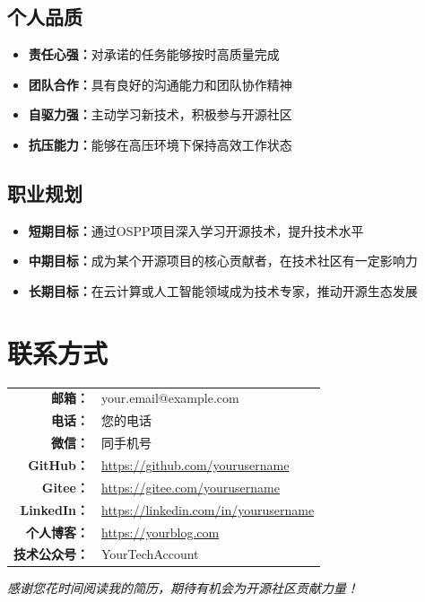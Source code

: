 \documentclass[a4paper,12pt]{article}
\makeatletter
\newcommand{\studentemail}{your.email@example.com}
\newcommand{\studentphone}{您的电话}
\makeatother
\begin{document}
\subsection{个人品质}
\begin{itemize}
    \item \textbf{责任心强：}对承诺的任务能够按时高质量完成
    \item \textbf{团队合作：}具有良好的沟通能力和团队协作精神
    \item \textbf{自驱力强：}主动学习新技术，积极参与开源社区
    \item \textbf{抗压能力：}能够在高压环境下保持高效工作状态
\end{itemize}

\subsection{职业规划}
\begin{itemize}
    \item \textbf{短期目标：}通过OSPP项目深入学习开源技术，提升技术水平
    \item \textbf{中期目标：}成为某个开源项目的核心贡献者，在技术社区有一定影响力
    \item \textbf{长期目标：}在云计算或人工智能领域成为技术专家，推动开源生态发展
\end{itemize}

\section{联系方式}

\begin{table}[H]
\centering
\begin{tabular}{rl}
    \textbf{邮箱：} & \studentemail \\[0.1cm]
    \textbf{电话：} & \studentphone \\[0.1cm]
    \textbf{微信：} & 同手机号 \\[0.1cm]
    \textbf{GitHub：} & \url{https://github.com/yourusername} \\[0.1cm]
    \textbf{Gitee：} & \url{https://gitee.com/yourusername} \\[0.1cm]
    \textbf{LinkedIn：} & \url{https://linkedin.com/in/yourusername} \\[0.1cm]
    \textbf{个人博客：} & \url{https://yourblog.com} \\[0.1cm]
    \textbf{技术公众号：} & YourTechAccount \\
\end{tabular}
\end{table}

\vfill

\begin{center}
    \textcolor{osppgray}{\textit{感谢您花时间阅读我的简历，期待有机会为开源社区贡献力量！}}
\end{center}
\end{document}
